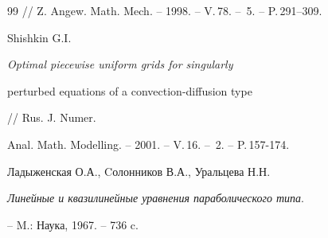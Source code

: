 \begin{thebibliography}{99}
// Z. Angew. Math. Mech. -- 1998. -- V.\,78. -- \No\,5. -- P.\,291--309.




{Shishkin G.I.} {\em Optimal piecewise uniform grids for singularly


perturbed equations of a convection-diffusion type} // Rus. J. Numer.


Anal. Math. Modelling. -- 2001. -- V.\,16. -- \No\,2. -- P.\,157-174.




{Ладыженская О.А., Cолонников В.А., Уральцева Н.Н.}


{\em Линейные и квазилинейные уравнения параболического типа}.


-- M.: Наука, 1967. -- 736 c.





\end{thebibliography}





\vskip 2cm














\label{end}













































\addtocounter{equation}{1}